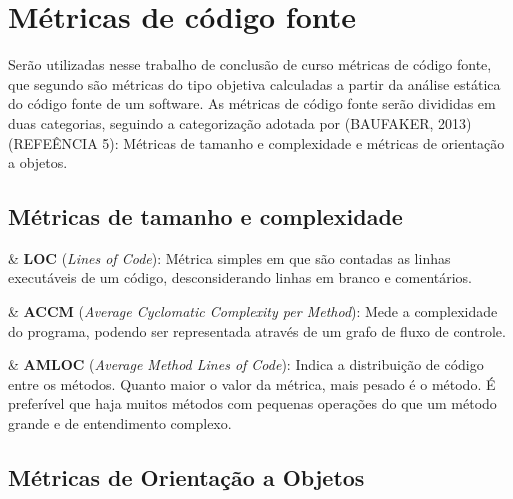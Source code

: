 \section{Métricas de código fonte}

Serão utilizadas nesse trabalho de conclusão de curso métricas de código fonte, que segundo \cite{Meirelles2013} são métricas do tipo objetiva calculadas a partir da análise estática do código fonte de um software. As métricas de código fonte serão divididas em duas categorias, seguindo a categorização adotada por (BAUFAKER, 2013) (REFEÊNCIA 5): Métricas de tamanho e complexidade e métricas de orientação a objetos.

\subsection{Métricas de tamanho e complexidade}

\begin{easylist}[itemize]

	& \textbf{LOC} (\textit{Lines of Code}): Métrica simples em que são contadas as linhas executáveis de um código, desconsiderando linhas em branco e comentários.  \cite{metricsandmodels} 
		
	& \textbf{ACCM} (\textit{Average Cyclomatic Complexity per Method}): Mede a complexidade do programa, podendo ser representada através de um grafo de fluxo de controle. \cite{McCabe76}

	& \textbf{AMLOC} (\textit{Average Method Lines of Code}): Indica a distribuição de código entre os métodos. Quanto maior o valor da métrica, mais pesado é o método. É preferível que haja muitos métodos com pequenas operações do que um método grande e de entendimento complexo. \cite{Meirelles2013}
	
\end{easylist}

\subsection{Métricas de Orientação a Objetos}

